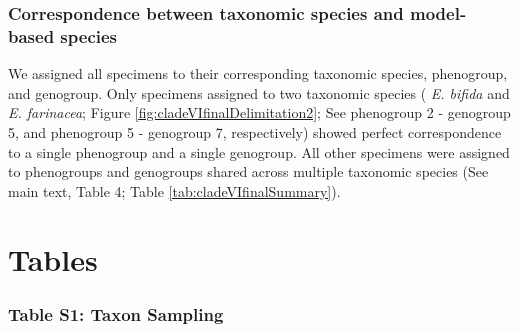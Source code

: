 \documentclass[
  11pt,
]{article}
\begin{document}
\hypertarget{correspondence-between-taxonomic-species-and-model-based-species-5}{%
\subsubsection{Correspondence between taxonomic species and model-based species}\label{correspondence-between-taxonomic-species-and-model-based-species-5}}

We assigned all specimens to their corresponding taxonomic species, phenogroup, and genogroup. Only specimens assigned to two taxonomic species ( \emph{E. bifida} and \emph{E. farinacea}; Figure \ref{fig:cladeVIfinalDelimitation2}; See phenogroup 2 - genogroup 5, and phenogroup 5 - genogroup 7, respectively) showed perfect correspondence to a single phenogroup and a single genogroup. All other specimens were assigned to phenogroups and genogroups shared across multiple taxonomic species (See main text, Table 4; Table \ref{tab:cladeVIfinalSummary}).

\pagebreak

\hypertarget{tables}{%
\section{Tables}\label{tables}}

\let\oldthefigure=\thefigure
\let\oldthetable=\thetable

\setcounter{figure}{0}
\makeatletter
\renewcommand{\thefigure}{S\@arabic\c@figure}
\renewcommand{\thetable}{S\@arabic\c@table}
\makeatother



\hypertarget{table-s1-taxon-sampling}{%
\subsubsection{Table S1: Taxon Sampling}\label{table-s1-taxon-sampling}}

\begingroup\fontsize{6}{8}\selectfont
\end{document}
